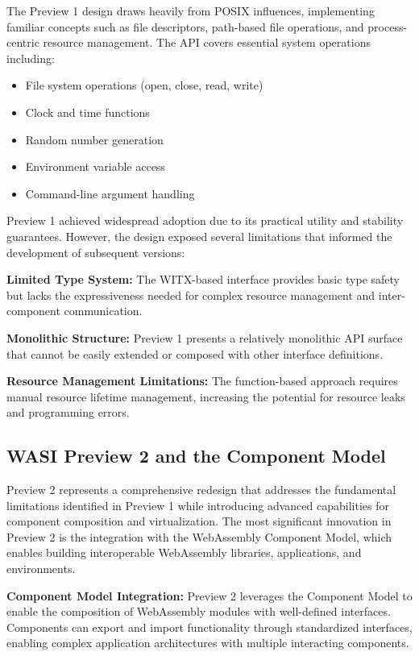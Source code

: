 The Preview 1 design draws heavily from POSIX influences, implementing familiar concepts such as file descriptors, path-based file operations, and process-centric resource management. The API covers essential system operations including:

\begin{itemize}
    \item File system operations (open, close, read, write)
    \item Clock and time functions
    \item Random number generation
    \item Environment variable access
    \item Command-line argument handling
\end{itemize}

Preview 1 achieved widespread adoption due to its practical utility and stability guarantees. However, the design exposed several limitations that informed the development of subsequent versions:

\textbf{Limited Type System:} The WITX-based interface provides basic type safety but lacks the expressiveness needed for complex resource management and inter-component communication.

\textbf{Monolithic Structure:} Preview 1 presents a relatively monolithic API surface that cannot be easily extended or composed with other interface definitions.

\textbf{Resource Management Limitations:} The function-based approach requires manual resource lifetime management, increasing the potential for resource leaks and programming errors.

\subsection{WASI Preview 2 and the Component Model}
\label{subsec:wasi-preview2}

Preview 2 represents a comprehensive redesign that addresses the fundamental limitations identified in Preview 1 while introducing advanced capabilities for component composition and virtualization\cite{wasi_component_model}. The most significant innovation in Preview 2 is the integration with the WebAssembly Component Model, which enables building interoperable WebAssembly libraries, applications, and environments.

\textbf{Component Model Integration:} Preview 2 leverages the Component Model to enable the composition of WebAssembly modules with well-defined interfaces. Components can export and import functionality through standardized interfaces, enabling complex application architectures with multiple interacting components.

